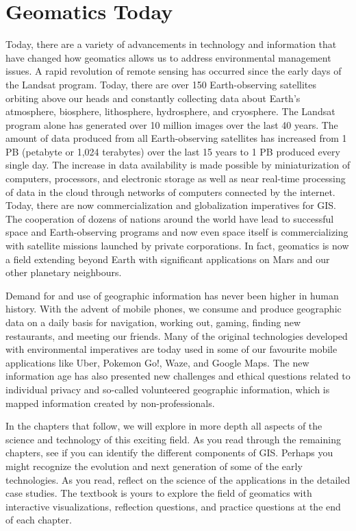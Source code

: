 \documentclass[
]{book}
\begin{document}
\section{Geomatics Today}\label{geomatics-today}

Today, there are a variety of advancements in technology and information that have changed how geomatics allows us to address environmental management issues. A rapid revolution of remote sensing has occurred since the early days of the Landsat program. Today, there are over 150 Earth-observing satellites orbiting above our heads and constantly collecting data about Earth's atmosphere, biosphere, lithosphere, hydrosphere, and cryosphere. The Landsat program alone has generated over 10 million images over the last 40 years. The amount of data produced from all Earth-observing satellites has increased from 1 PB (petabyte or 1,024 terabytes) over the last 15 years to 1 PB produced every single day. The increase in data availability is made possible by miniaturization of computers, processors, and electronic storage as well as near real-time processing of data in the cloud through networks of computers connected by the internet. Today, there are now commercialization and globalization imperatives for GIS. The cooperation of dozens of nations around the world have lead to successful space and Earth-observing programs and now even space itself is commercializing with satellite missions launched by private corporations. In fact, geomatics is now a field extending beyond Earth with significant applications on Mars and our other planetary neighbours.

Demand for and use of geographic information has never been higher in human history. With the advent of mobile phones, we consume and produce geographic data on a daily basis for navigation, working out, gaming, finding new restaurants, and meeting our friends. Many of the original technologies developed with environmental imperatives are today used in some of our favourite mobile applications like Uber, Pokemon Go!, Waze, and Google Maps. The new information age has also presented new challenges and ethical questions related to individual privacy and so-called volunteered geographic information, which is mapped information created by non-professionals.

In the chapters that follow, we will explore in more depth all aspects of the science and technology of this exciting field. As you read through the remaining chapters, see if you can identify the different components of GIS. Perhaps you might recognize the evolution and next generation of some of the early technologies. As you read, reflect on the science of the applications in the detailed case studies. The textbook is yours to explore the field of geomatics with interactive visualizations, reflection questions, and practice questions at the end of each chapter.
\end{document}
